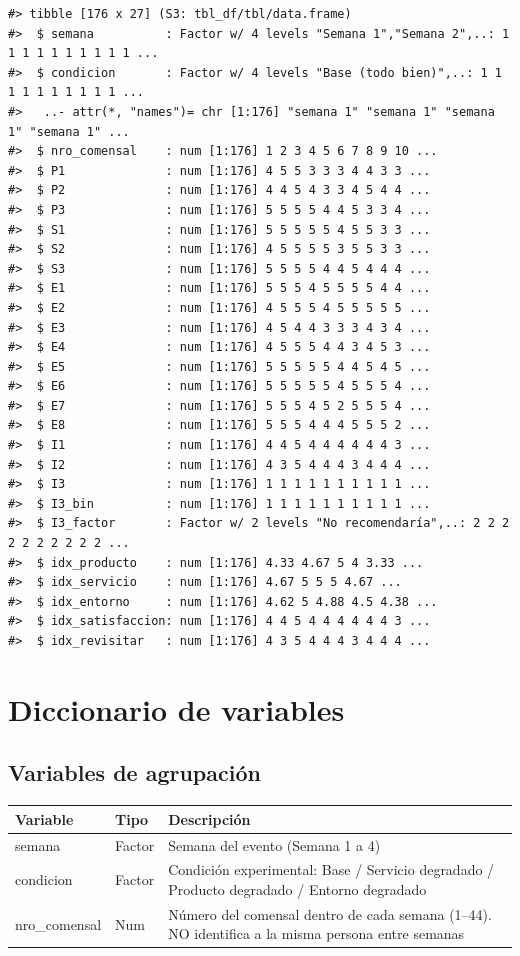 \documentclass[
  spanish,
]{article}
\begin{document}
\begin{verbatim}
#> tibble [176 x 27] (S3: tbl_df/tbl/data.frame)
#>  $ semana          : Factor w/ 4 levels "Semana 1","Semana 2",..: 1 1 1 1 1 1 1 1 1 1 ...
#>  $ condicion       : Factor w/ 4 levels "Base (todo bien)",..: 1 1 1 1 1 1 1 1 1 1 ...
#>   ..- attr(*, "names")= chr [1:176] "semana 1" "semana 1" "semana 1" "semana 1" ...
#>  $ nro_comensal    : num [1:176] 1 2 3 4 5 6 7 8 9 10 ...
#>  $ P1              : num [1:176] 4 5 5 3 3 3 4 4 3 3 ...
#>  $ P2              : num [1:176] 4 4 5 4 3 3 4 5 4 4 ...
#>  $ P3              : num [1:176] 5 5 5 5 4 4 5 3 3 4 ...
#>  $ S1              : num [1:176] 5 5 5 5 5 4 5 5 3 3 ...
#>  $ S2              : num [1:176] 4 5 5 5 5 3 5 5 3 3 ...
#>  $ S3              : num [1:176] 5 5 5 5 4 4 5 4 4 4 ...
#>  $ E1              : num [1:176] 5 5 5 4 5 5 5 5 4 4 ...
#>  $ E2              : num [1:176] 4 5 5 5 4 5 5 5 5 5 ...
#>  $ E3              : num [1:176] 4 5 4 4 3 3 3 4 3 4 ...
#>  $ E4              : num [1:176] 4 5 5 5 4 4 3 4 5 3 ...
#>  $ E5              : num [1:176] 5 5 5 5 5 4 4 5 4 5 ...
#>  $ E6              : num [1:176] 5 5 5 5 5 4 5 5 5 4 ...
#>  $ E7              : num [1:176] 5 5 5 4 5 2 5 5 5 4 ...
#>  $ E8              : num [1:176] 5 5 5 4 4 4 5 5 5 2 ...
#>  $ I1              : num [1:176] 4 4 5 4 4 4 4 4 4 3 ...
#>  $ I2              : num [1:176] 4 3 5 4 4 4 3 4 4 4 ...
#>  $ I3              : num [1:176] 1 1 1 1 1 1 1 1 1 1 ...
#>  $ I3_bin          : num [1:176] 1 1 1 1 1 1 1 1 1 1 ...
#>  $ I3_factor       : Factor w/ 2 levels "No recomendaría",..: 2 2 2 2 2 2 2 2 2 2 ...
#>  $ idx_producto    : num [1:176] 4.33 4.67 5 4 3.33 ...
#>  $ idx_servicio    : num [1:176] 4.67 5 5 5 4.67 ...
#>  $ idx_entorno     : num [1:176] 4.62 5 4.88 4.5 4.38 ...
#>  $ idx_satisfaccion: num [1:176] 4 4 5 4 4 4 4 4 4 3 ...
#>  $ idx_revisitar   : num [1:176] 4 3 5 4 4 4 3 4 4 4 ...
\end{verbatim}

\section{Diccionario de variables}\label{diccionario-de-variables}

\subsection{Variables de agrupación}\label{variables-de-agrupaciuxf3n}

\begin{table}[!h]
\centering
\begin{tabular}{ll>{\raggedright\arraybackslash}p{9cm}}
\toprule
Variable & Tipo & Descripción\\
\midrule
semana & Factor & Semana del evento (Semana 1 a 4)\\
condicion & Factor & Condición experimental: Base / Servicio degradado / Producto degradado / Entorno degradado\\
nro\_comensal & Num & Número del comensal dentro de cada semana (1--44). NO identifica a la misma persona entre semanas\\
\bottomrule
\end{tabular}
\end{table}
\end{document}
